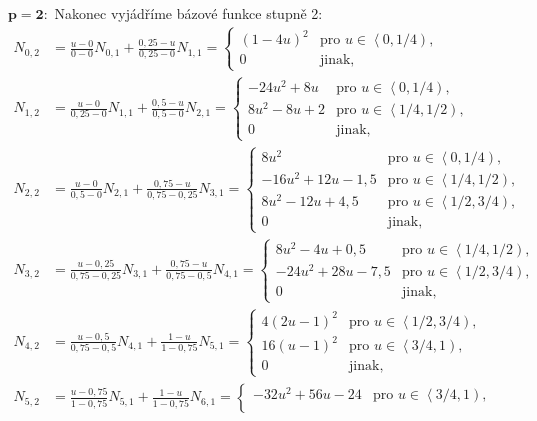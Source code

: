 \begin{priklad}
	$\mathbf{p=2}:$
	Nakonec vyjádříme bázové funkce stupně 2:
	\begin{align*}
	N_{0,2}&=\frac{u-0}   {0   -0}   N_{0,1}+\frac{0,25-u}{0,25-0}   N_{1,1}=
	\begin{cases}
		\left(1-4u\right)^2 & \text{pro $u\in\left\langle 0,1/4 \right)$,}\\
		0 & \text{jinak,}
	\end{cases}\\
	N_{1,2}&=\frac{u-0}   {0,25-0}   N_{1,1}+\frac{0,5-u} {0,5 -0}   N_{2,1}=
	\begin{cases}
		-24u^2+8u & \text{pro $u\in\left\langle 0,1/4 \right)$,}\\
		8u^2-8u+2 & \text{pro $u\in\left\langle 1/4,1/2 \right)$,}\\
		0 & \text{jinak,}
	\end{cases}\\
	N_{2,2}&=\frac{u-0}   {0,5 -0}   N_{2,1}+\frac{0,75-u}{0,75-0,25}N_{3,1}=
	\begin{cases}
		8u^2 & \text{pro $u\in\left\langle 0,1/4 \right)$,}\\
		-16u^2+12u-1,5 & \text{pro $u\in\left\langle 1/4,1/2 \right)$,}\\
		8u^2-12u+4,5 & \text{pro $u\in\left\langle 1/2,3/4 \right)$,}\\
		0 & \text{jinak,}
	\end{cases}\\
	N_{3,2}&=\frac{u-0,25}{0,75-0,25}N_{3,1}+\frac{0,75-u}{0,75-0,5} N_{4,1}=
	\begin{cases}
		8u^2-4u+0,5 & \text{pro $u\in\left\langle 1/4,1/2 \right)$,}\\
		-24u^2+28u-7,5 & \text{pro $u\in\left\langle 1/2,3/4 \right)$,}\\
		0 & \text{jinak,}
	\end{cases}\\
	N_{4,2}&=\frac{u-0,5} {0,75-0,5} N_{4,1}+\frac{1-u}   {1   -0,75}N_{5,1}=
	\begin{cases}
		4\left(2u-1\right)^2 & \text{pro $u\in\left\langle 1/2,3/4 \right)$,}\\
		16\left(u-1\right)^2 & \text{pro $u\in\left\langle 3/4,1 \right)$,}\\
		0 & \text{jinak,}
	\end{cases}\\
	N_{5,2}&=\frac{u-0,75}{1   -0,75}N_{5,1}+\frac{1-u}   {1   -0,75}N_{6,1}=
	\begin{cases}
		-32u^2+56u-24 & \text{pro $u\in\left\langle 3/4,1 \right)$,}\\

\end{cases}
\end{align*}
\end{priklad}
